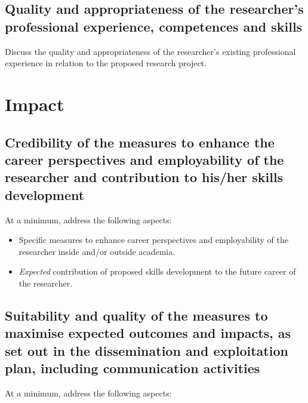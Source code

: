 \documentclass[12pt,draftproposal]{msca-pf}
\begin{document}
\subsection{Quality and appropriateness of the researcher's professional
    experience, competences and skills}
\label{ssc:excellence:researcher}

Discuss the quality and appropriateness of the researcher’s existing professional
experience in relation to the proposed research project.

\section{Impact }
\label{sc:impact}

\subsection{Credibility of the measures to enhance the career perspectives
    and employability of the researcher and contribution to his/her skills
    development}
\label{ssc:impact:career}

At a minimum, address the following aspects:

\begin{itemize}
    \item Specific measures to enhance career perspectives and employability of
    the researcher inside and/or outside academia.
    \item \emph{Expected} contribution of proposed skills development to the
    future career of the researcher.
\end{itemize}

\subsection{Suitability and quality of the measures to maximise expected
    outcomes and impacts, as set out in the dissemination and exploitation plan,
    including communication activities }
\label{ssc:impact:outcomes}

At a minimum, address the following aspects:
\end{document}
